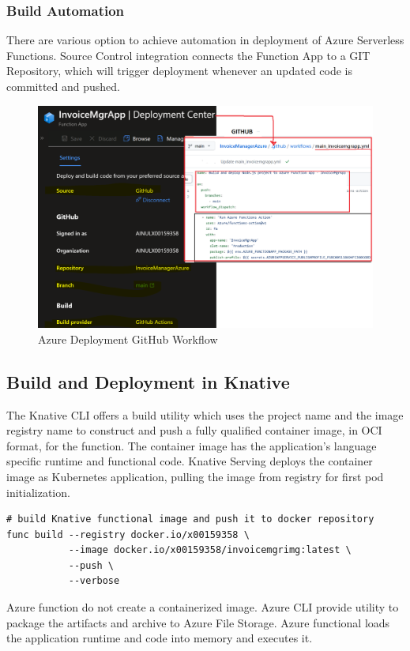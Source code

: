 \documentclass{article}
\begin{document}
\subsubsection{Build Automation}
\begin{flushleft}
There are various option to achieve automation in deployment of Azure Serverless Functions. Source Control integration connects the Function App to a GIT Repository, which will trigger deployment whenever an updated code is committed and pushed. 
\end{flushleft}
\begin{figure}[h]
    \centering
    \includegraphics[scale=0.20]{images/AzureDeploymentCenter.PNG}
    \caption{Azure Deployment GitHub Workflow}
\end{figure}

\subsection{Build and Deployment in Knative}
\begin{flushleft}
The Knative \gls{CLI} offers a build utility which uses the project name and the image registry name to construct and push a fully qualified container image, in \gls{OCI} format, for the function.  
The container image has the application's language specific runtime and functional code.
\hfill\break
Knative Serving deploys the container image as Kubernetes application, pulling the image from registry for first pod initialization.
\par
\begin{verbatim}
# build Knative functional image and push it to docker repository
func build --registry docker.io/x00159358 \
           --image docker.io/x00159358/invoicemgrimg:latest \
           --push \
           --verbose
\end{verbatim}

\par
Azure function do not create a containerized image. Azure \gls{CLI} provide utility to package the artifacts and archive to Azure File Storage. Azure functional loads the application runtime and code into memory and executes it.

\end{flushleft}
\pagebreak
\end{document}
